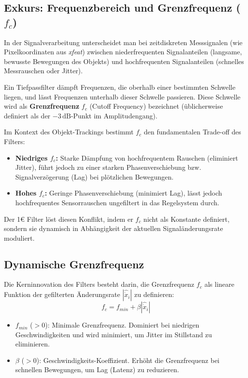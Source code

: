\documentclass{article}
\begin{document}
\subsection{Exkurs: Frequenzbereich und Grenzfrequenz ($f_c$)}
\label{sec:cutoff_frequency}

In der Signalverarbeitung unterscheidet man bei zeitdiskreten Messsignalen (wie Pixelkoordinaten aus \textit{xfeat}) zwischen niederfrequenten Signalanteilen (langsame, bewusste Bewegungen des Objekts) und hochfrequenten Signalanteilen (schnelles Messrauschen oder Jitter).

Ein Tiefpassfilter dämpft Frequenzen, die oberhalb einer bestimmten Schwelle liegen, und lässt Frequenzen unterhalb dieser Schwelle passieren. Diese Schwelle wird als \textbf{Grenzfrequenz} $f_c$ (Cutoff Frequency) bezeichnet (üblicherweise definiert als der $-3\,\text{dB}$-Punkt im Amplitudengang).

Im Kontext des Objekt-Trackings bestimmt $f_c$ den fundamentalen Trade-off des Filters:
\begin{itemize}
    \item \textbf{Niedriges $f_c$:} Starke Dämpfung von hochfrequentem Rauschen (eliminiert Jitter), führt jedoch zu einer starken Phasenverschiebung bzw. Signalverzögerung (Lag) bei plötzlichen Bewegungen.
    \item \textbf{Hohes $f_c$:} Geringe Phasenverschiebung (minimiert Lag), lässt jedoch hochfrequentes Sensorrauschen ungefiltert in das Regelsystem durch.
\end{itemize}

Der 1\euro{} Filter löst diesen Konflikt, indem er $f_c$ nicht als Konstante definiert, sondern sie dynamisch in Abhängigkeit der aktuellen Signaländerungsrate moduliert.




\subsection{Dynamische Grenzfrequenz}
Die Kerninnovation des Filters besteht darin, die Grenzfrequenz $f_c$ als lineare Funktion der gefilterten Änderungsrate $|\hat{\dot{x}}_i|$ zu definieren:
\begin{equation}
    f_c = f_{min} + \beta |\hat{\dot{x}}_i|
\end{equation}
\begin{itemize}
    \item $f_{min}$ ($>0$): Minimale Grenzfrequenz. Dominiert bei niedrigen Geschwindigkeiten und wird minimiert, um Jitter im Stillstand zu eliminieren.
    \item $\beta$ ($>0$): Geschwindigkeits-Koeffizient. Erhöht die Grenzfrequenz bei schnellen Bewegungen, um Lag (Latenz) zu reduzieren.
\end{itemize}
\end{document}

